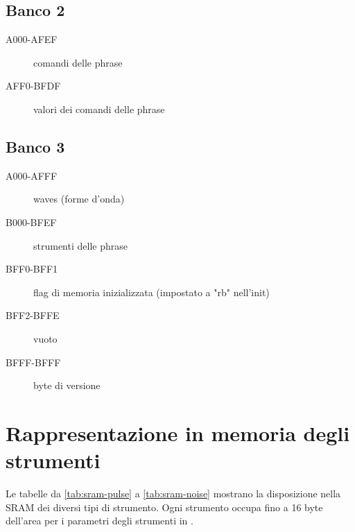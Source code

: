 \subsection{Banco 2}

\begin{description}
    \item[A000-AFEF] comandi delle phrase
    \item[AFF0-BFDF] valori dei comandi delle phrase
\end{description}

\subsection{Banco 3}

\begin{description}
    \item[A000-AFFF] waves (forme d'onda)
    \item[B000-BFEF] strumenti delle phrase
    \item[BFF0-BFF1] flag di memoria inizializzata (impostato a "rb" nell'init)
    \item[BFF2-BFFE] vuoto
    \item[BFFF-BFFF] byte di versione
\end{description}

\section{Rappresentazione in memoria degli strumenti}

Le tabelle da \ref{tab:sram-pulse} a \ref{tab:sram-noise} mostrano la disposizione nella SRAM dei diversi tipi di strumento. Ogni strumento occupa fino a 16 byte dell'area per i parametri degli strumenti in .

